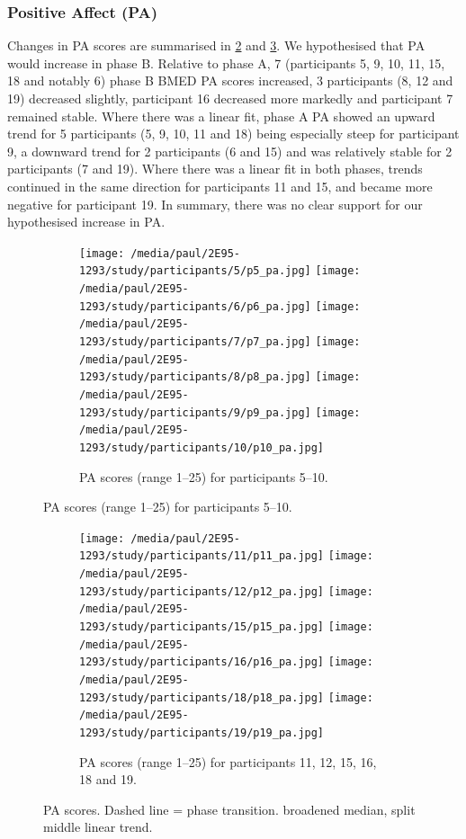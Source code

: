 \documentclass[man,floatsintext,a4paper,biblatex]{apa6}\usepackage[]{graphicx}\usepackage[]{color}
\newcommand\strokeA{\tikz[baseline=-.5ex]{ \draw[black,thick,align=center] (0,0) -- (2ex,0); }}
\newcommand\strokeB{\tikz[baseline=-.5ex]{ \draw[red,thick,dotted] (0,0) -- (2ex,0); }}
\begin{document}
\subsubsection{Positive Affect (PA)}

Changes in PA scores are summarised in \cref{fig:va-pa-a} and
\cref{fig:va-pa-b}. We hypothesised that PA would increase in phase
B. Relative to phase A, 7 (participants 5, 9, 10, 11, 15, 18 and notably
6) phase B BMED PA scores increased, 3 participants (8, 12 and 19)
decreased slightly, participant 16 decreased more markedly and participant
7 remained stable. Where there was a linear fit, phase A PA showed an
upward trend for 5 participants (5, 9, 10, 11 and 18) being especially
steep for participant 9, a downward trend for 2 participants (6 and 15)
and was relatively stable for 2 participants (7 and 19). Where there was
a linear fit in both phases, trends continued in the same direction for
participants 11 and 15, and became more negative for participant 19. In
summary, there was no clear support for our hypothesised increase in PA.

\begin{figure}[!htbp]
  \begin{subfigure}[!htbp]{\textwidth}
    \texttt{[image: /media/paul/2E95-1293/study/participants/5/p5\_pa.jpg]}
    \texttt{[image: /media/paul/2E95-1293/study/participants/6/p6\_pa.jpg]}
    \texttt{[image: /media/paul/2E95-1293/study/participants/7/p7\_pa.jpg]}
    \texttt{[image: /media/paul/2E95-1293/study/participants/8/p8\_pa.jpg]}
    \texttt{[image: /media/paul/2E95-1293/study/participants/9/p9\_pa.jpg]}
    \texttt{[image: /media/paul/2E95-1293/study/participants/10/p10\_pa.jpg]}
    \caption{PA scores (range 1--25) for participants 5--10.}
    \label{fig:va-pa-a}
  \end{subfigure}
\end{figure}

\begin{figure}
\ContinuedFloat
  \begin{subfigure}[!htbp]{\textwidth}
    \texttt{[image: /media/paul/2E95-1293/study/participants/11/p11\_pa.jpg]}
    \texttt{[image: /media/paul/2E95-1293/study/participants/12/p12\_pa.jpg]}
    \texttt{[image: /media/paul/2E95-1293/study/participants/15/p15\_pa.jpg]}
    \texttt{[image: /media/paul/2E95-1293/study/participants/16/p16\_pa.jpg]}
    \texttt{[image: /media/paul/2E95-1293/study/participants/18/p18\_pa.jpg]}
    \texttt{[image: /media/paul/2E95-1293/study/participants/19/p19\_pa.jpg]}
    \caption{PA scores (range 1--25) for participants 11, 12, 15, 16, 18 and 19.}
    \label{fig:va-pa-b}
  \end{subfigure}
\caption{PA scores. Dashed line = phase transition. \protect\strokeA{} broadened
median, \protect\strokeB{} split middle linear trend.}
\label{fig:pa}
\end{figure}
\end{document}
